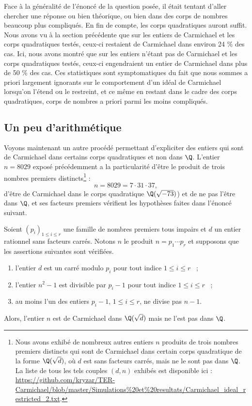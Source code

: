 Face à la généralité de l'énoncé de la question posée, il était tentant d'aller chercher une réponse ou bien théorique, ou bien dans des corps de nombres beaucoup plus compliqués. En fin de compte, les corps quadratiques auront suffit. Nous avons vu à la section précédente que sur les entiers de Carmichael et les corps quadratiques testés, ceux-ci restaient de Carmichael dans environ 24 \% des cas. Ici, nous avons montré que sur les entiers n'étant pas de Carmichael et les corps quadratiques testés, ceux-ci engendraient un entier de Carmichael dans plus de 50 \% des cas. Ces statistiques sont symptomatiques du fait que nous sommes a priori largement ignorants sur le comportement d'un idéal de Carmichael lorsqu'on l'étend ou le restreint, et ce même en restant dans le cadre des corps quadratiques, corps de nombres a priori parmi les moins compliqués.

\subsection{Un peu d'arithmétique}

Voyons maintenant un autre procédé permettant d'expliciter des entiers qui sont de Carmichael dans certains corps quadratiques et non dans $\Q$. L'entier $n = 8029$ exposé précédemment a la particularité d'être le produit de trois nombres premiers distincts\footnote{Nous avons exhibé de nombreux autres entiers $n$ produits de trois nombres premiers distincts qui sont de Carmichael dans certain corps quadratique de la forme $\Q(\sqrt{d})$, où $d$ est sans facteurs carrés, mais ne le sont pas dans $\Q$. La liste de tous les tels couples $(d, n)$ exhibés est disponible ici : \url{https://github.com/kryzar/TER-Carmichael/blob/master/Simulations\%20et\%20resultats/Carmichael\_ideal\_restricted\_2.txt}.} : \[n = 8029 = 7 \cdot 31 \cdot 37,\] d'être de Carmichael dans le corps quadratique $\Q(\sqrt{-73})$) et de ne pas l'être dans $\Q$, et ses facteurs premiers vérifient les hypothèses faites dans l'énoncé suivant.

\begin{proposition}\label{pqr-arithmetique}
	Soient $(p_i)_{1\leq i \leq r}$ une famille de nombres premiers tous impairs et $d$ un entier rationnel sans facteurs carrés. Notons $n$ le produit $n=p_1\cdots p_r$ et supposons que les assertions suivantes sont vérifiées.
	\begin{enumerate}
		\item l'entier $d$ est un carré modulo $p_i$ pour tout indice $1\leq i \leq r$ ~; \label{pqr-a}
		\item l'entier $n^2-1$ est divisible par $p_i - 1$ pour tout indice $1\leq i \leq r$ ~; \label{pqr-b}
		\item au moins l'un des entiers $p_i - 1$, $1\leq i \leq r$, ne divise pas $n-1$. \label{pqr-c}
	\end{enumerate}
Alors, l'entier $n$ est de Carmichael dans $\Q(\sqrt{d})$ mais ne l'est pas dans $\Q$.
\end{proposition}

